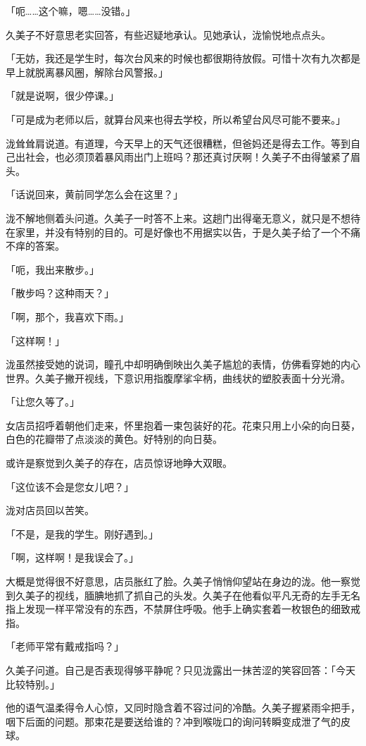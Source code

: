 \documentclass[UTF8]{ctexart}
\begin{document}
    「呃……这个嘛，嗯……没错。」 

    久美子不好意思老实回答，有些迟疑地承认。见她承认，泷愉悦地点点头。 

    「无妨，我还是学生时，每次台风来的时候也都很期待放假。可惜十次有九次都是早上就脱离暴风圈，解除台风警报。」 

    「就是说啊，很少停课。」 

    「可是成为老师以后，就算台风来也得去学校，所以希望台风尽可能不要来。」 

    泷耸耸肩说道。有道理，今天早上的天气还很糟糕，但爸妈还是得去工作。等到自己出社会，也必须顶着暴风雨出门上班吗？那还真讨厌啊！久美子不由得皱紧了眉头。 

    「话说回来，黄前同学怎么会在这里？」 

    泷不解地侧着头问道。久美子一时答不上来。这趟门出得毫无意义，就只是不想待在家里，并没有特别的目的。可是好像也不用据实以告，于是久美子给了一个不痛不痒的答案。 

    「呃，我出来散步。」 

    「散步吗？这种雨天？」 

    「啊，那个，我喜欢下雨。」 

    「这样啊！」 

    泷虽然接受她的说词，瞳孔中却明确倒映出久美子尴尬的表情，仿佛看穿她的内心世界。久美子撇开视线，下意识用指腹摩挲伞柄，曲线状的塑胶表面十分光滑。 

    「让您久等了。」 

    女店员招呼着朝他们走来，怀里抱着一束包装好的花。花束只用上小朵的向日葵，白色的花瓣带了点淡淡的黄色。好特别的向日葵。 

    或许是察觉到久美子的存在，店员惊讶地睁大双眼。 

    「这位该不会是您女儿吧？」 

    泷对店员回以苦笑。 

    「不是，是我的学生。刚好遇到。」 

    「啊，这样啊！是我误会了。」 

    大概是觉得很不好意思，店员胀红了脸。久美子悄悄仰望站在身边的泷。他一察觉到久美子的视线，腼腆地抓了抓自己的头发。久美子在他看似平凡无奇的左手无名指上发现一样平常没有的东西，不禁屏住呼吸。他手上确实套着一枚银色的细致戒指。 

    「老师平常有戴戒指吗？」 

    久美子问道。自己是否表现得够平静呢？只见泷露出一抹苦涩的笑容回答：「今天比较特别。」 

    他的语气温柔得令人心惊，又同时隐含着不容过问的冷酷。久美子握紧雨伞把手，咽下后面的问题。那束花是要送给谁的？冲到喉咙口的询问转瞬变成泄了气的皮球。 
\end{document}
